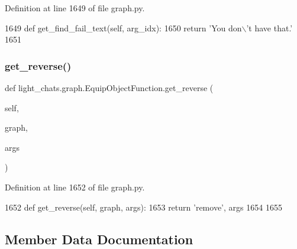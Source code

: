 Definition at line 1649 of file graph.\+py.


\begin{DoxyCode}
1649     \textcolor{keyword}{def }get\_find\_fail\_text(self, arg\_idx):
1650         \textcolor{keywordflow}{return} \textcolor{stringliteral}{'You don\(\backslash\)'t have that.'}
1651 
\end{DoxyCode}
\mbox{\label{classlight__chats_1_1graph_1_1EquipObjectFunction_aa6c4d9ced2e8732087350592441e82bd}} 
\subsubsection{\texorpdfstring{get\+\_\+reverse()}{get\_reverse()}}
{\footnotesize\ttfamily def light\+\_\+chats.\+graph.\+Equip\+Object\+Function.\+get\+\_\+reverse (\begin{DoxyParamCaption}\item[{}]{self,  }\item[{}]{graph,  }\item[{}]{args }\end{DoxyParamCaption})}



Definition at line 1652 of file graph.\+py.


\begin{DoxyCode}
1652     \textcolor{keyword}{def }get\_reverse(self, graph, args):
1653         \textcolor{keywordflow}{return} \textcolor{stringliteral}{'remove'}, args
1654 
1655 
\end{DoxyCode}


\subsection{Member Data Documentation}
\mbox{\label{classlight__chats_1_1graph_1_1EquipObjectFunction_a43535bde5e33eb613bddfe618f4a4ef6}} 
